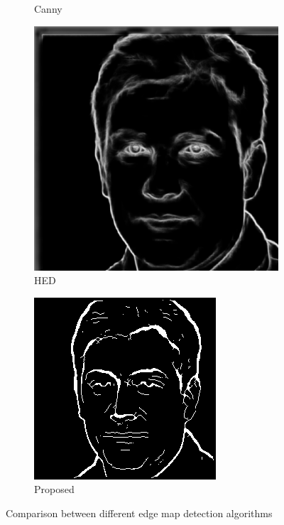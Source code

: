 \documentclass{70_styles/svproc}
\begin{document}
\begin{figure}
\begin{subfigure}[b]{0.2\textwidth}
         \caption{Canny}
     \end{subfigure}
     \begin{subfigure}[b]{0.2\textwidth}
         \centering
         \includegraphics[width=\textwidth]{70_figures/HED_seed00154.png}
         \caption{HED}
     \end{subfigure}
     \begin{subfigure}[b]{0.2\textwidth}
         \centering
         \includegraphics[width=\textwidth]{70_figures/seed0154_EM.png}
         \caption{Proposed}
     \end{subfigure}
     \caption{Comparison between different edge map detection algorithms}
\end{figure}
\end{document}
